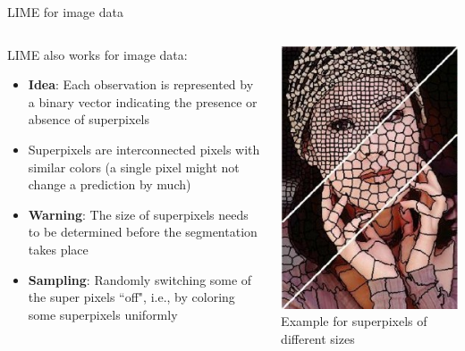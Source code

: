 \documentclass[11pt,compress,t,notes=noshow, aspectratio=169, xcolor=table]{beamer}
\begin{document}
\begin{frame}[c]{LIME for image data}
	\begin{columns}
		\begin{column}{0.67\textwidth}
			LIME also works for image data:  
			\begin{itemize}
				\item \textbf{Idea}: Each observation is represented by a binary vector indicating the presence or absence of superpixels 
				\item Superpixels are interconnected pixels with similar colors (a single pixel might not change a prediction by much)
				\item \textbf{Warning}: The size of superpixels needs to be determined before the segmentation takes place
				\item \textbf{Sampling}: Randomly switching some of the super pixels ``off", i.e., by coloring some superpixels uniformly
			\end{itemize}		
		\end{column}
		\begin{column}{0.26\textwidth}  
			\begin{center}
				\includegraphics[width=1\textwidth]{figure/superpixel_woman}
				{Example for superpixels of different sizes}
			\end{center}
		\end{column}
	\end{columns}
    

\end{frame}
\end{document}
